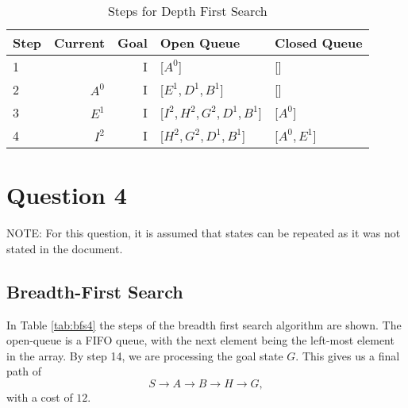 \documentclass{article}
\begin{document}
    \begin{table}[!htp]\centering
        \caption{Steps for Depth First Search}\label{tab:dfs3}
        \scriptsize
        \begin{tabular}{lrrll}\toprule
        Step &Current &Goal & Open Queue &Closed Queue  \\\midrule
        1&  &I &[$A^0$] &[] \\
        2& $A^0$ &I &[$E^1, D^1, B^1$] &[] \\
        3& $E^1$ &I &[$I^2, H^2, G^2, D^1, B^1$] &[$A^0$] \\
        4& $I^2$ &I &[$H^2, G^2, D^1, B^1$] &[$A^0, E^1$] \\
        \end{tabular}
    \end{table}


\section{Question 4}
    NOTE: For this question, it is assumed that states can be repeated as it was not stated in the document.
\subsection{Breadth-First Search}
    In Table \ref{tab:bfs4} the steps of the breadth first search algorithm are shown. The open-queue is a FIFO queue, with the next element being the left-most element in the array.
    By step 14, we are processing the goal state $G$. This gives us a final path of
    \begin{equation}
        S \rightarrow A  \rightarrow B \rightarrow H \rightarrow G,
    \end{equation}
    with a cost of $12$.
\end{document}
